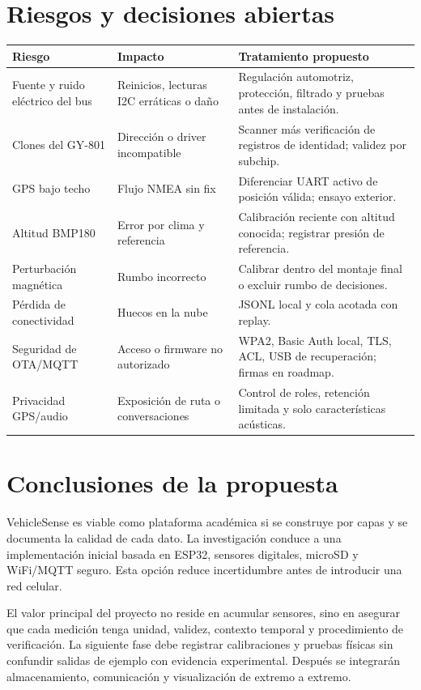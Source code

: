 \documentclass[11pt,a4paper,oneside]{report}
\begin{document}
\chapter{Riesgos y decisiones abiertas}

\begin{longtable}{p{4.1cm}p{5.0cm}p{5.0cm}}
\toprule
\textbf{Riesgo} & \textbf{Impacto} & \textbf{Tratamiento propuesto}\\
\midrule
\endhead
Fuente y ruido eléctrico del bus & Reinicios, lecturas I2C erráticas o daño & Regulación automotriz, protección, filtrado y pruebas antes de instalación.\\
Clones del GY-801 & Dirección o driver incompatible & Scanner más verificación de registros de identidad; validez por subchip.\\
GPS bajo techo & Flujo NMEA sin fix & Diferenciar UART activo de posición válida; ensayo exterior.\\
Altitud BMP180 & Error por clima y referencia & Calibración reciente con altitud conocida; registrar presión de referencia.\\
Perturbación magnética & Rumbo incorrecto & Calibrar dentro del montaje final o excluir rumbo de decisiones.\\
Pérdida de conectividad & Huecos en la nube & JSONL local y cola acotada con replay.\\
Seguridad de OTA/MQTT & Acceso o firmware no autorizado & WPA2, Basic Auth local, TLS, ACL, USB de recuperación; firmas en roadmap.\\
Privacidad GPS/audio & Exposición de ruta o conversaciones & Control de roles, retención limitada y solo características acústicas.\\
\bottomrule
\end{longtable}

\chapter{Conclusiones de la propuesta}
VehicleSense es viable como plataforma académica si se construye por capas y se
documenta la calidad de cada dato. La investigación conduce a una implementación
inicial basada en ESP32, sensores digitales, microSD y WiFi/MQTT seguro. Esta opción
reduce incertidumbre antes de introducir una red celular.

El valor principal del proyecto no reside en acumular sensores, sino en asegurar que
cada medición tenga unidad, validez, contexto temporal y procedimiento de verificación.
La siguiente fase debe registrar calibraciones y pruebas físicas sin confundir salidas
de ejemplo con evidencia experimental. Después se integrarán almacenamiento,
comunicación y visualización de extremo a extremo.
\end{document}
